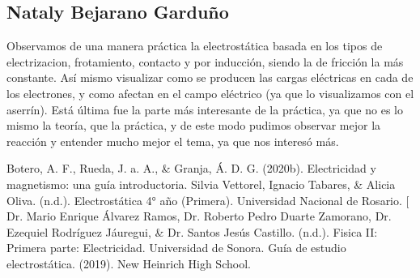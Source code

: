 \documentclass[14pt]{article}
\begin{document}
\begin{multicols}{2}
\subsection{Nataly Bejarano Garduño}
Observamos de una manera práctica la electrostática basada en los tipos de electrizacion, frotamiento, contacto y por inducción, siendo la de fricción la más constante.
Así mismo visualizar como se producen las cargas eléctricas en cada de los electrones, y como afectan en el campo eléctrico (ya que lo visualizamos con el aserrín).
Está última fue la parte más interesante de la práctica, ya que no es lo mismo la teoría, que la práctica, y de este modo pudimos observar mejor la reacción y entender mucho mejor el tema, ya que nos interesó más.
\end{multicols}
\clearpage
\newpage	
	\begin{thebibliography}{0}
		Botero, A. F., Rueda, J. a. A., \& Granja, Á. D. G. (2020b). Electricidad y magnetismo: una guía introductoria.
		Silvia Vettorel, Ignacio Tabares, \& Alicia Oliva. (n.d.). Electrostática 4° año (Primera). Universidad Nacional de Rosario.
		[ Dr. Mario Enrique Álvarez Ramos, Dr. Roberto Pedro Duarte Zamorano, Dr. Ezequiel Rodríguez Jáuregui, \& Dr. Santos Jesús Castillo. (n.d.). Fisica II: Primera parte: Electricidad. Universidad de Sonora.
		Guía de estudio electrostática. (2019). New Heinrich High School.
	\end{thebibliography}
\end{document}
